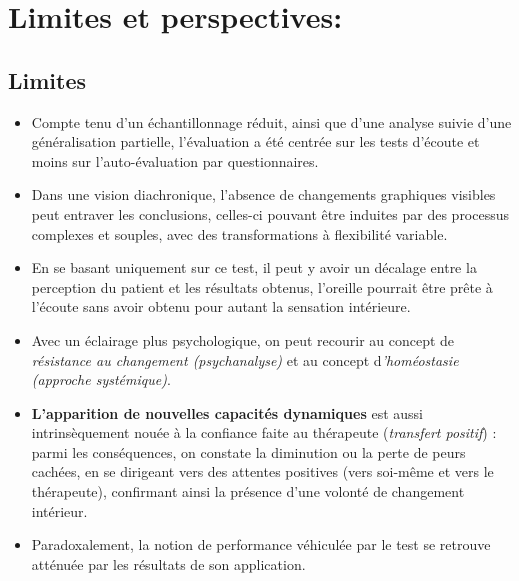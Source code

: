 






  \section{Limites et perspectives: }

\subsection{Limites}


  \begin{itemize}

\item Compte tenu  d'un échantillonnage réduit, ainsi que d'une analyse
  suivie d'une généralisation partielle, l'évaluation a été centrée sur les
  tests d'écoute et moins sur
  l'auto-évaluation par questionnaires.

\item   Dans une vision diachronique, l'absence de changements graphiques
 visibles
 peut  entraver les conclusions, celles-ci pouvant être
 induites par des processus complexes et souples, avec des
 transformations à flexibilité variable.
\item En se basant uniquement sur ce test, il peut y avoir un décalage entre
la perception du patient et les résultats obtenus, l'oreille pourrait
être prête à l'écoute sans avoir obtenu pour autant la sensation intérieure.


\item Avec un éclairage plus psychologique, on peut recourir au concept de
\textit{résistance au changement (psychanalyse)} et au concept
d\textit{'homéostasie (approche systémique)}.

\item \textbf{L'apparition de nouvelles
capacités  dynamiques }est aussi intrinsèquement nouée à la confiance
faite au thérapeute (\textit{transfert positif})
\autocite{roustang1986} : parmi les conséquences, on constate la
diminution ou la perte de peurs cachées,  en se dirigeant vers des
attentes positives (vers soi-même et vers le thérapeute), confirmant ainsi la
présence d'une volonté de changement intérieur.

\item Paradoxalement, la notion de performance véhiculée par le test se
  retrouve atténuée par les résultats de son application.
  \end{itemize}





